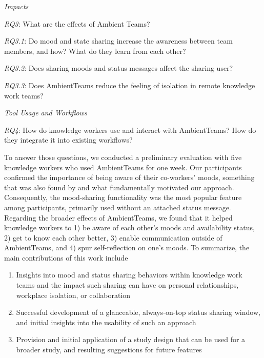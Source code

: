 \medskip\noindent\textit{Impacts}

\smallskip\noindent\textit{RQ3}: What are the effects of Ambient Teams?

\setlength{\leftskip}{0.5cm}
\smallskip\noindent\textit{RQ3.1}: Do mood and state sharing increase the awareness between team members, and how? What do they learn from each other?

\smallskip\noindent\textit{RQ3.2}: Does sharing moods and status messages affect the sharing user?


\smallskip\noindent\textit{RQ3.3}: Does AmbientTeams reduce the feeling of isolation in remote knowledge work teams?

\setlength{\leftskip}{0pt}

\medskip\noindent\textit{Tool Usage and Workflows}

\smallskip\noindent\textit{RQ4}: How do knowledge workers use and interact with AmbientTeams? How do they integrate it into existing workflows?

\bigskip\noindent To answer those questions, we conducted a preliminary evaluation with five knowledge workers who used AmbientTeams for one week. Our participants confirmed the importance of being aware of their co-workers' moods, something that was also found by \textcite{garcia1999emotional, dullemond2013fixing} and what fundamentally motivated our approach. Consequently, the mood-sharing functionality was the most popular feature among participants, primarily used without an attached status message. Regarding the broader effects of AmbientTeams, we found that it helped knowledge workers to 1) be aware of each other's moods and availability status, 2) get to know each other better, 3) enable communication outside of AmbientTeams, and 4) spur self-reflection on one's moods. To summarize, the main contributions of this work include

\begin{enumerate}
    \item Insights into mood and status sharing behaviors within knowledge work teams and the impact such sharing can have on personal relationships, workplace isolation, or collaboration
    \item Successful development of a glanceable, always-on-top status sharing window, and initial insights into the usability of such an approach
    \item Provision and initial application of a study design that can be used for a broader study, and resulting suggestions for future features
\end{enumerate}

